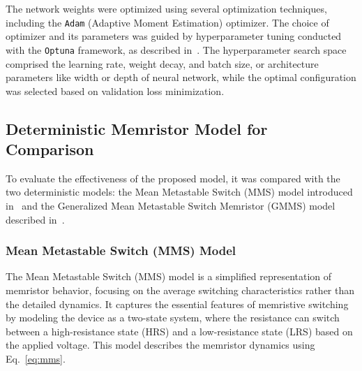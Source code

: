 \documentclass[lettersize,journal]{IEEEtran}
\begin{document}
The network weights were optimized using several optimization techniques, including the \texttt{Adam} (Adaptive Moment Estimation) optimizer. The choice of optimizer and its parameters was guided by hyperparameter tuning conducted with the \texttt{Optuna} framework, as described in~\cite{Akiba2019}. The hyperparameter search space comprised the learning rate, weight decay, and batch size, or architecture parameters like width or depth of neural network, while the optimal configuration was selected based on validation loss minimization.


\subsection{Deterministic Memristor Model for Comparison}
\noindent To evaluate the effectiveness of the proposed model, it was compared with the two deterministic models: the Mean Metastable Switch (MMS) model introduced in~\cite{Minati2020} and the  Generalized Mean Metastable Switch Memristor (GMMS) model described in~\cite{Molter2016, Ostrovskii2021}.

\subsubsection{Mean Metastable Switch (MMS) Model}
The Mean Metastable Switch (MMS) model is a simplified representation of memristor behavior, focusing on the average switching characteristics rather than the detailed dynamics. It captures the essential features of memristive switching by modeling the device as a two-state system, where the resistance can switch between a high-resistance state (HRS) and a low-resistance state (LRS) based on the applied voltage. This model describes the memristor dynamics using Eq.~\eqref{eq:mms}.
\end{document}
